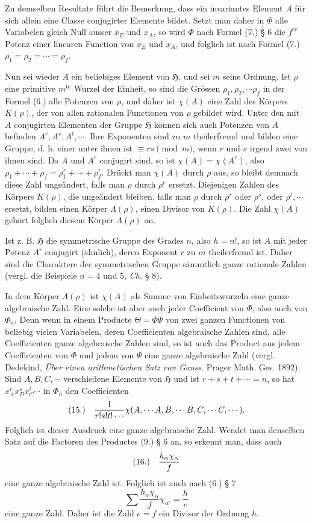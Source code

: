 \documentclass[11pt]{article}
\makeatletter
\newcommand{\Hgrp}{\mathfrak{H}}
\newcommand{\frobtagc}[2]{\[\begin{array}{@{}r@{\quad}c@{}}\textup{(#1)} & \displaystyle #2\end{array}\]}
\makeatother
\begin{document}
Zu demselben Resultate führt die Bemerkung, dass ein invariantes Element $A$ für sich allein eine Classe conjugirter Elemente bildet. Setzt man daher in $\Phi$ alle Variabelen gleich Null ausser $x_E$ und $x_A$, so wird $\Phi$ nach Formel (7.) § 6 die $f^{\mathrm{te}}$ Potenz einer linearen Function von $x_E$ und $x_A$, und folglich ist nach Formel (7.) $\rho_1=\rho_2=\cdots=\rho_f$.

Nun sei wieder $A$ ein beliebiges Element von $\Hgrp$, und sei $m$ seine Ordnung. Ist $\rho$ eine primitive $m^{\mathrm{te}}$ Wurzel der Einheit, so sind die Grössen $\rho_1,\rho_2,\cdots\rho_f$ in der Formel (6.) alle Potenzen von $\rho$, und daher ist $\chi(A)$ eine Zahl des Körpers $K(\rho)$, der von allen rationalen Functionen von $\rho$ gebildet wird. Unter den mit $A$ conjugirten Elementen der Gruppe $\Hgrp$ können sich auch Potenzen von $A$ befinden $A^r,A^s,A^t,\cdots$. Ihre Exponenten sind zu $m$ theilerfremd und bilden eine Gruppe, d. h. einer unter ihnen ist $\equiv rs\pmod m$, wenn $r$ und $s$ irgend zwei von ihnen sind. Da $A$ und $A^r$ conjugirt sind, so ist $\chi(A)=\chi(A^r)$, also $\rho_1+\cdots+\rho_f=\rho_1^r+\cdots+\rho_f^r$. Drückt man $\chi(A)$ durch $\rho$ aus, so bleibt demnach diese Zahl ungeändert, falls man $\rho$ durch $\rho^r$ ersetzt. Diejenigen Zahlen des Körpers $K(\rho)$, die ungeändert bleiben, falls man $\rho$ durch $\rho^r$ oder $\rho^s$, oder $\rho^t,\cdots$ ersetzt, bilden einen Körper $\Lambda(\rho)$, einen Divisor von $K(\rho)$. Die Zahl $\chi(A)$ gehört folglich diesem Körper $\Lambda(\rho)$ an.

Ist z. B. $\Hgrp$ die symmetrische Gruppe des Grades $n$, also $h=n!$, so ist $A$ mit jeder Potenz $A^r$ conjugirt (ähnlich), deren Exponent $r$ zu $m$ theilerfremd ist. Daher sind die Charaktere der symmetrischen Gruppe sämmtlich ganze rationale Zahlen (vergl. die Beispiele $n=4$ und 5, \emph{Ch.} § 8).

In dem Körper $\Lambda(\rho)$ ist $\chi(A)$ als Summe von Einheitswurzeln eine ganze algebraische Zahl. Eine solche ist aber auch jeder Coefficient von $\Phi$, also auch von $\Phi_n$. Denn wenn in einem Producte $\Theta=\Phi\Psi$ von zwei ganzen Functionen von beliebig vielen Variabelen, deren Coefficienten algebraische Zahlen sind, alle Coefficienten ganze algebraische Zahlen sind, so ist auch das Product aus jedem Coefficienten von $\Phi$ und jedem von $\Psi$ eine ganze algebraische Zahl (vergl. Dedekind, \emph{Über einen arithmetischen Satz von Gauss}. Prager Math. Ges. 1892). Sind $A,B,C,\cdots$ verschiedene Elemente von $\Hgrp$ und ist $r+s+t+\cdots=n$, so hat $x_A^rx_B^sx_C^t\cdots$ in $\Phi_n$ den Coefficienten
\frobtagc{15.}{\frac{1}{r!s!t!\cdots}\chi(A,\cdots A,B,\cdots B,C,\cdots C,\cdots).}
Folglich ist dieser Ausdruck eine ganze algebraische Zahl. Wendet man denselben Satz auf die Factoren des Productes (9.) § 6 an, so erkennt man, dass auch
\frobtagc{16.}{\frac{h_\alpha\chi_\alpha}{f}}
eine ganze algebraische Zahl ist. Folglich ist auch nach (6.) § 7
\[
\sum\frac{h_\alpha\chi_\alpha}{f}\chi_{\alpha'}=\frac{h}{e}
\]
eine ganze Zahl. Daher ist die Zahl $e=f$ ein Divisor der Ordnung $h$.
\end{document}
